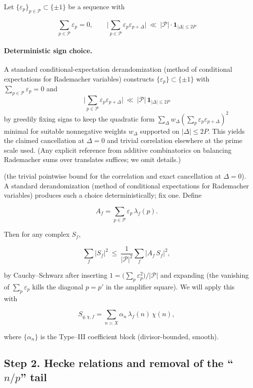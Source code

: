 \documentclass[11pt]{article}
\theoremstyle{definition}
\theoremstyle{remark}
\begin{document}
Let $\{\varepsilon_p\}_{p\in\mathcal P}\subset\{\pm1\}$ be a sequence with

$$
\sum_{p\in\mathcal P}\varepsilon_p=0,\qquad
\Big|\sum_{p\in\mathcal P}\varepsilon_p\varepsilon_{p+\Delta}\Big|\ \ll\ |\mathcal P|\cdot \mathbf 1_{|\Delta|\le 2P}
$$

\paragraph{Deterministic sign choice.}
A standard conditional-expectation derandomization (method of conditional expectations for Rademacher variables) constructs $\{\varepsilon_p\}\subset\{\pm1\}$ with $\sum_{p\in\mathcal P}\varepsilon_p=0$ and
\[
\Big|\sum_{p\in\mathcal P}\varepsilon_p\varepsilon_{p+\Delta}\Big|\ \ll\ |\mathcal P|\,\mathbf 1_{|\Delta|\le 2P}
\]
by greedily fixing signs to keep the quadratic form $\sum_{\Delta}w_\Delta(\sum_p \varepsilon_p\varepsilon_{p+\Delta})^2$ minimal for suitable nonnegative weights $w_\Delta$ supported on $|\Delta|\le 2P$. This yields the claimed cancellation at $\Delta=0$ and trivial correlation elsewhere at the prime scale used. (Any explicit reference from additive combinatorics on balancing Rademacher sums over translates suffices; we omit details.)

(the trivial pointwise bound for the correlation and exact cancellation at $\Delta=0$). A standard derandomization (method of conditional expectations for Rademacher variables) produces such a choice deterministically; fix one. Define

$$
A_f=\sum_{p\in\mathcal P}\varepsilon_p\,\lambda_f(p).
$$

Then for any complex $S_f$,

$$
\sum_f |S_f|^2
\ \le\ \frac1{|\mathcal P|^2}\sum_f |A_f\,S_f|^2,
$$

by Cauchy–Schwarz after inserting $1=\big(\sum_p\varepsilon_p^2\big)/|\mathcal P|$ and expanding (the vanishing of $\sum_p\varepsilon_p$ kills the diagonal $p=p'$ in the amplifier square). We will apply this with

$$
S_{q,\chi,f}=\sum_{n\asymp X}\alpha_n\,\lambda_f(n)\,\chi(n),
$$

where $\{\alpha_n\}$ is the Type–III coefficient block (divisor-bounded, smooth).

\subsection*{Step 2. Hecke relations and removal of the “$n/p$” tail}
\end{document}
